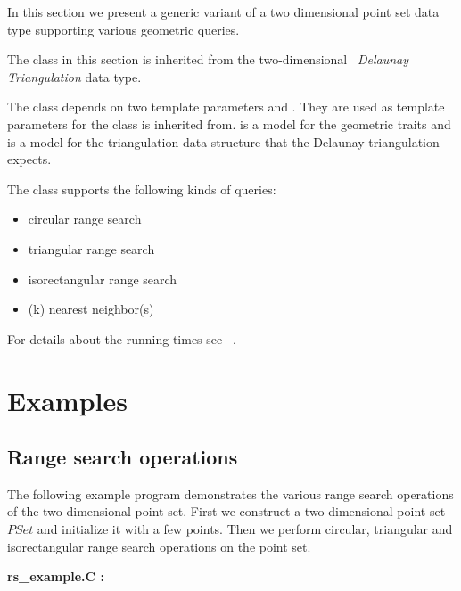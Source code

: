 In this section we present a generic variant of a two dimensional point set
data type supporting various geometric queries.

The  class in this section is inherited
from the two-dimensional \cgal\ {\em Delaunay Triangulation} data type.

The  class depends on two template parameters  and .
They are used as template parameters for the 
class  is inherited from.  is a model for the
geometric traits and  is a model for the triangulation data structure that the Delaunay triangulation
expects.

The  class supports the following kinds of queries:
\begin{itemize}
\item circular range search
\item triangular range search
\item isorectangular range search
\item (k) nearest neighbor(s)
\end{itemize}
For details about the running times see ~\cite{mn-lpcgc-00}.

\section{Examples}

\subsection{Range search operations}

The following example program demonstrates the various range search operations
of the two dimensional point set.
First we construct a two dimensional point set $PSet$ and initialize it with a few points.
Then we perform circular, triangular and isorectangular range search operations on the
point set.

\ccHtmlLinksOff

{\bf rs\_example.C :}


\ccHtmlLinksOn

